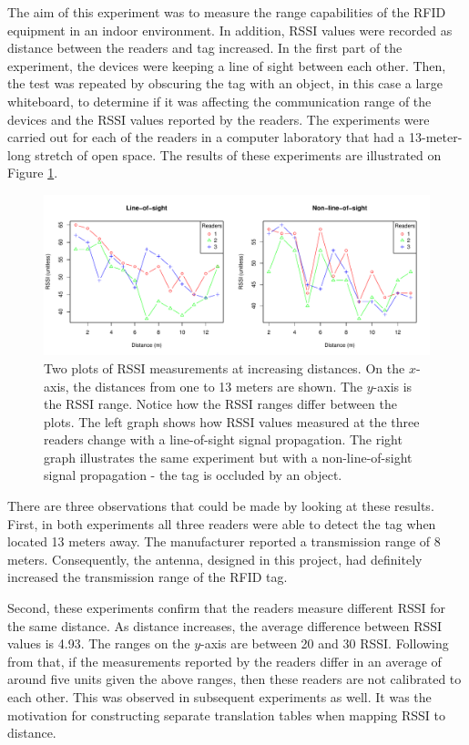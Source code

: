 The aim of this experiment was to measure the range capabilities of the RFID equipment in an indoor environment. In addition, RSSI values were recorded as distance between the readers and tag increased. In the first part of the experiment, the devices were keeping a line of sight between each other. Then, the test was repeated by obscuring the tag with an object, in this case a large whiteboard, to determine if it was affecting the communication range of the devices and the RSSI values reported by the readers. The experiments were carried out for each of the readers in a computer laboratory that had a 13-meter-long stretch of open space. The results of these experiments are illustrated on Figure \ref{fig:13m}.

\begin{figure}[h]
	\begin{center}
		\includegraphics[width=1\textwidth]{figures/rssi_distance_13m}
		\caption{Two plots of RSSI measurements at increasing distances. On the $x$-axis, the distances from one to 13 meters are shown. The $y$-axis is the RSSI range. Notice how the RSSI ranges differ between the plots. The left graph shows how RSSI values measured at the three readers change with a line-of-sight signal propagation. The right graph illustrates the same experiment but with a non-line-of-sight signal propagation - the tag is occluded by an object.}
		\label{fig:13m}
	\end{center}
\end{figure}

There are three observations that could be made by looking at these results. First, in both experiments all three readers were able to detect the tag when located 13 meters away. The manufacturer reported a transmission range of 8 meters. Consequently, the antenna, designed in this project, had definitely increased the transmission range of the RFID tag. 

Second, these experiments confirm that the readers measure different RSSI for the same distance. As distance increases, the average difference between RSSI values is 4.93. The ranges on the $y$-axis are between 20 and 30 RSSI. Following from that, if the measurements reported by the readers differ in an average of around five units given the above ranges, then these readers are not calibrated to each other. This was observed in subsequent experiments as well. It was the motivation for constructing separate translation tables when mapping RSSI to distance.

